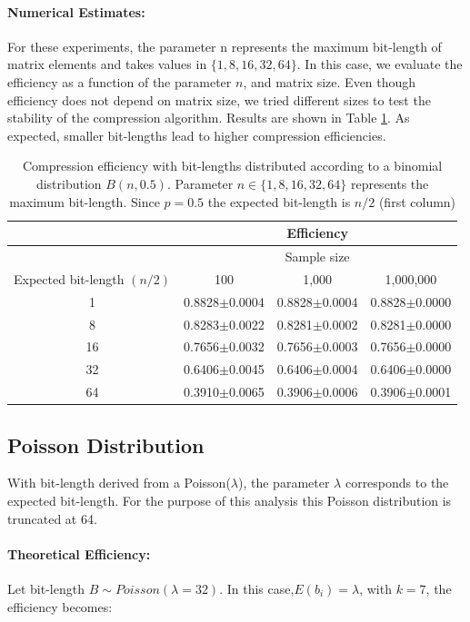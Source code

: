 \documentclass[10pt]{article}
\begin{document}
\paragraph{Numerical Estimates:}
For these experiments, the parameter n represents the maximum bit-length of matrix elements and takes values in $\{1, 8, 16, 32, 64\}$. In this case, we evaluate the efficiency as a function of the parameter $n$, and matrix size. Even though efficiency does not depend on matrix size, we tried different sizes to test the stability of the compression algorithm. Results are shown in Table \ref{tab:04}. As expected, smaller bit-lengths lead to higher compression efficiencies.


\begin{table}[h]
  \centering
  \caption{Compression efficiency with bit-lengths distributed according to a binomial distribution $B(n,0.5)$. Parameter $n \in \{1, 8, 16, 32, 64 \} $ represents the maximum bit-length. Since $p=0.5$ the expected bit-length is $n/2$ (first column)}
   \begin{tabular}{cccc}
     \hline
     & &Efficiency& \\
     \hline
     & &Sample size& \\
     Expected bit-length $(n/2)$ &100 &1,000 &1,000,000 \\
     \hline
     1 &0.8828$\pm$0.0004&0.8828$\pm$0.0004&0.8828$\pm$0.0000\\ 
     8 &0.8283$\pm$0.0022&0.8281$\pm$0.0002&0.8281$\pm$0.0000\\ 
     16&0.7656$\pm$0.0032&0.7656$\pm$0.0003&0.7656$\pm$0.0000\\ 
     32&0.6406$\pm$0.0045&0.6406$\pm$0.0004&0.6406$\pm$0.0000\\ 
     64&0.3910$\pm$0.0065&0.3906$\pm$0.0006&0.3906$\pm$0.0001\\
     \hline
  \end{tabular}
  \label{tab:04}
\end{table}

\subsection*{Poisson Distribution}
With bit-length derived from a Poisson($\lambda$), the parameter $\lambda$ corresponds to the expected bit-length. For the purpose of this analysis this Poisson distribution is truncated at 64. 
\paragraph{Theoretical Efficiency:}
Let bit-length $B \sim Poisson(\lambda=32)$. In this case,$E(b_i) = \lambda$, with $k=7$,  the efficiency becomes:
\end{document}

